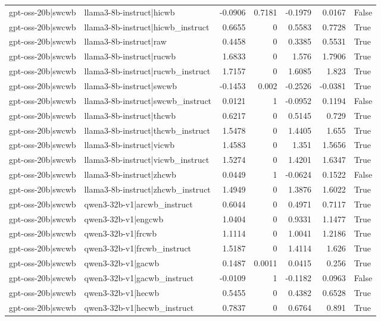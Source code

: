 \begin{table}
\begin{tabular}{l l r r r r l}
gpt-oss-20b|swcwb & llama3-8b-instruct|hicwb & -0.0906 & 0.7181 & -0.1979 & 0.0167 & False \\
gpt-oss-20b|swcwb & llama3-8b-instruct|hicwb_instruct & 0.6655 & 0 & 0.5583 & 0.7728 & True \\
gpt-oss-20b|swcwb & llama3-8b-instruct|raw & 0.4458 & 0 & 0.3385 & 0.5531 & True \\
gpt-oss-20b|swcwb & llama3-8b-instruct|rucwb & 1.6833 & 0 & 1.576 & 1.7906 & True \\
gpt-oss-20b|swcwb & llama3-8b-instruct|rucwb_instruct & 1.7157 & 0 & 1.6085 & 1.823 & True \\
gpt-oss-20b|swcwb & llama3-8b-instruct|swcwb & -0.1453 & 0.002 & -0.2526 & -0.0381 & True \\
gpt-oss-20b|swcwb & llama3-8b-instruct|swcwb_instruct & 0.0121 & 1 & -0.0952 & 0.1194 & False \\
gpt-oss-20b|swcwb & llama3-8b-instruct|thcwb & 0.6217 & 0 & 0.5145 & 0.729 & True \\
gpt-oss-20b|swcwb & llama3-8b-instruct|thcwb_instruct & 1.5478 & 0 & 1.4405 & 1.655 & True \\
gpt-oss-20b|swcwb & llama3-8b-instruct|vicwb & 1.4583 & 0 & 1.351 & 1.5656 & True \\
gpt-oss-20b|swcwb & llama3-8b-instruct|vicwb_instruct & 1.5274 & 0 & 1.4201 & 1.6347 & True \\
gpt-oss-20b|swcwb & llama3-8b-instruct|zhcwb & 0.0449 & 1 & -0.0624 & 0.1522 & False \\
gpt-oss-20b|swcwb & llama3-8b-instruct|zhcwb_instruct & 1.4949 & 0 & 1.3876 & 1.6022 & True \\
gpt-oss-20b|swcwb & qwen3-32b-v1|arcwb_instruct & 0.6044 & 0 & 0.4971 & 0.7117 & True \\
gpt-oss-20b|swcwb & qwen3-32b-v1|engcwb & 1.0404 & 0 & 0.9331 & 1.1477 & True \\
gpt-oss-20b|swcwb & qwen3-32b-v1|frcwb & 1.1114 & 0 & 1.0041 & 1.2186 & True \\
gpt-oss-20b|swcwb & qwen3-32b-v1|frcwb_instruct & 1.5187 & 0 & 1.4114 & 1.626 & True \\
gpt-oss-20b|swcwb & qwen3-32b-v1|gacwb & 0.1487 & 0.0011 & 0.0415 & 0.256 & True \\
gpt-oss-20b|swcwb & qwen3-32b-v1|gacwb_instruct & -0.0109 & 1 & -0.1182 & 0.0963 & False \\
gpt-oss-20b|swcwb & qwen3-32b-v1|hecwb & 0.5455 & 0 & 0.4382 & 0.6528 & True \\
gpt-oss-20b|swcwb & qwen3-32b-v1|hecwb_instruct & 0.7837 & 0 & 0.6764 & 0.891 & True \\

\end{tabular}
\end{table}
